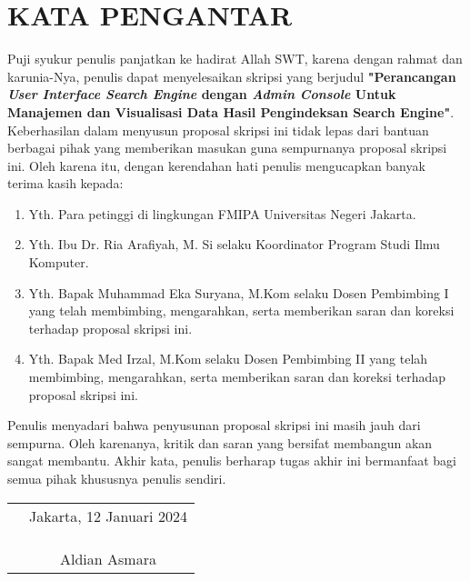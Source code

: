 \chapter*{\centering \large KATA PENGANTAR}

Puji syukur penulis panjatkan ke hadirat Allah SWT, karena dengan rahmat dan karunia-Nya, penulis dapat menyelesaikan skripsi yang berjudul \textbf{"Perancangan \textit{User Interface Search Engine} dengan \textit{Admin Console} Untuk Manajemen dan Visualisasi Data Hasil Pengindeksan Search Engine"}. Keberhasilan dalam menyusun proposal skripsi ini tidak lepas dari bantuan berbagai pihak yang memberikan masukan guna sempurnanya proposal skripsi ini. Oleh karena itu, dengan kerendahan hati penulis mengucapkan banyak terima kasih kepada:

\begin{enumerate}
	
	\item{Yth. Para petinggi di lingkungan FMIPA Universitas Negeri Jakarta.}
	\item{Yth. Ibu Dr. Ria Arafiyah, M. Si selaku Koordinator Program Studi Ilmu Komputer.}
	\item{Yth. Bapak Muhammad Eka Suryana, M.Kom selaku Dosen Pembimbing I yang telah membimbing, mengarahkan, serta memberikan saran dan koreksi terhadap proposal skripsi ini.}
	\item{Yth. Bapak Med Irzal, M.Kom selaku Dosen Pembimbing II yang telah membimbing, mengarahkan, serta memberikan saran dan koreksi terhadap proposal skripsi ini.}
\end{enumerate}

Penulis menyadari bahwa penyusunan proposal skripsi ini masih jauh dari sempurna. Oleh karenanya, kritik dan saran yang bersifat membangun akan sangat membantu. Akhir kata, penulis berharap tugas akhir ini bermanfaat bagi semua pihak khususnya penulis sendiri.

\vspace{4cm}

\begin{tabular}{p{7.5cm}c}
	&Jakarta, 12 Januari 2024\\
	&\\
	&\\
	&\\
	&Aldian Asmara
\end{tabular}